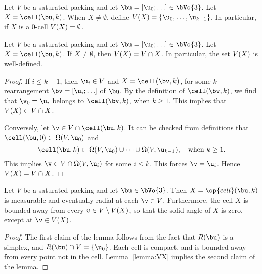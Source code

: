 \begin{cnl}
\begin{definition}
\label{def:CapV}
%
Let $V$ be a saturated packing and let $\bu=[\u_0;\ldots]\in \bVo{3}$.
Let $X=\cell(\bu,k)$.  When $X\ne\emptyset$, define $\CapV{V}(X) =
\setenumdots{\u}{0}{k-1}$.  In particular, if $X$ is a $0$-cell
$V(X)=\emptyset$.
\end{definition}



\begin{lemma}[]
\label{lemma:VX}
%
Let $V$ be a saturated packing and let $\bu=[\u_0;\ldots]\in \bVo{3}$.
Let $X=\cell(\bu,k)$.  If $X\ne\emptyset$, then $V(X) = V\cap
X$.  In particular, the set $V(X)$ is well-defined.
\end{lemma}


\begin{proof}  
  If $i\le k-1$, then $\u_i\in V$ and $X=\cell(\bv,k)$, for some
  $k$-rearrangement $\bv=[\u_i;\ldots]$ of $\bu$.  By the definition
  of $\cell(\bv,k)$, we find that $\v_0=\u_i$ belongs to
  $\cell(\bv,k)$, when $k\ge 1$.  This implies that $V(X)\subset
  V\cap X$.

Conversely, let $\v\in V\cap \cell(\bu,k)$.  It can be checked from
definitions that $\cell(\bu,0)\subset \Omega(V,\u_0)$ and
\[
\cell(\bu,k)\subset \Omega(V,\u_0)\cup \cdots \cup\Omega(V,\u_{k-1}), \quad 
\text{when~} k\ge1.
\]
This implies $\v\in V\cap\Omega(V,\u_i)$ for some $i\le k$.  This
forces $\v=\u_i$.  Hence $V(X) = V\cap X$.
\end{proof}

\begin{lemma}
\label{lemma:cell-radial}
%
Let $V$ be a saturated packing and let $\bu\in \bVo{3}$.  Then
$X=\op{cell}(\bu,k)$ is measurable and eventually radial at each
$\v\in V$.  Furthermore, the cell $X$ is bounded away from every $v\in
V\setminus V(X)$, so that the solid angle of $X$ is zero,
except at $\v\in \CapV{V}(X)$.
\end{lemma}

\begin{proof} The first claim of the
 lemma follows from the fact that $R(\bu)$ is a
  simplex, and $R(\bu)\cap V = \braced{\u_0}$.
Each cell is compact, and is bounded away from every point not in
the cell. Lemma~\ref{lemma:VX} implies the second claim of the lemma.
\end{proof}


\end{cnl}
